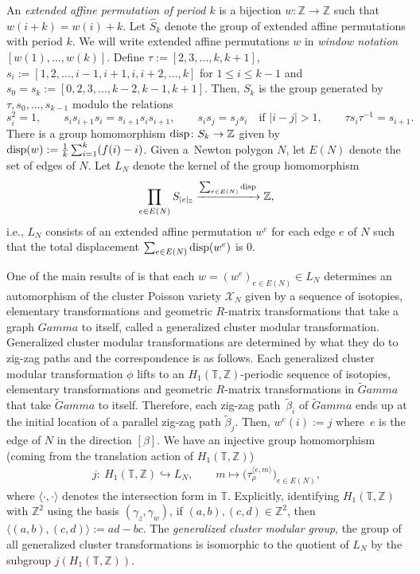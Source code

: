 \documentclass[10pt,a4paper]{amsart}
\numberwithin{equation}{section}
\newcommand{\Z}{{\mathbb Z}}
\newcommand{\T}{{\mathbb T}}
\newcommand{\disp}{{\rm disp}}
\newcommand{\ra}{\rightarrow}
\def\Gamma{Gamma}
\def\widehat#1{#1}
\begin{document}
	An \textit{extended affine permutation of period $k$} is a bijection $w\colon \Z \ra \Z$ such that ${w(i+k)}={w(i)+k}$. Let $\hat S_k$ denote the group of extended affine permutations with period $k$. We will write extended affine permutations $w$ in \emph{window notation} $[w(1), \dots, w(k)]$. Define $\tau\!:=\![2,3,\dots ,k,\allowbreak {k+1}]$, $s_i:= [1,2,\dots ,i-1,i+1,i,i+2,\dots ,k]$ for $1\leq i\leq k-1$ and $s_0=s_k:= [0,2,3,\dots ,{k-2},\allowbreak{k-1},{k+1}]$. Then, $\widehat S_k$ is the group generated by $\tau,s_0,\dots,s_{k-1}$ modulo the relations
	\[
	s_i^2=1, \qquad s_i s_{i+1} s_i = s_{i+1} s_i s_{i+1}, \qquad s_i s_j=s_j s_i \quad \text{if $|i-j|>1$} ,\qquad \tau s_{i}\tau ^{-1}=s_{i+1}.
	\]
	There is a group homomorphism $\disp\colon \widehat S_k \ra \Z$ given by $\disp(w):=\frac 1 k \sum_{i=1}^k (f(i)-i)$. Given a~Newton polygon $N$, let $E(N)$ denote the set of edges of $N$. Let $L_N$ denote the kernel of the group homomorphism
	\[
	\prod_{e \in E(N)} \widehat S_{|e|_\Z} \xrightarrow[]{\sum_{e \in E(N)} \disp} \Z,
	\]
	i.e., $L_N$ consists of an extended affine permutation $w^e$ for each edge $e$ of $N$ such that the total displacement $\sum_{e \in E(N)} \disp(w^e)$ is $0$.
	
One of the main results of \cite{GeRa} is that each $w=(w^e)_{e \in E(N)} \in L_N$ determines an automorphism of the cluster Poisson variety $\mathcal X_N$ given by a sequence of isotopies, elementary transformations and geometric $R$-matrix transformations that take a graph $\Gamma$ to itself, called a {generalized cluster modular transformation}. Generalized cluster modular transformations are determined by what they do to zig-zag paths and the correspondence is as follows. Each generalized cluster modular transformation $\phi$ lifts to an $H_1(\T,\Z)$-periodic sequence of isotopies, elementary transformations and geometric $R$-matrix transformations in $\widetilde \Gamma$ that take $\widetilde \Gamma$ to itself. Therefore, each zig-zag path~$\widetilde \beta_i$ of $\widetilde \Gamma$ ends up at the initial location of a parallel zig-zag path $\widetilde \beta_j$. Then, $w^e(i):=j$ where~$e$ is the edge of $N$ in the direction $[\beta]$. We have an injective group homomorphism (coming from the translation action of $H_1(\T,\Z)$)
	\begin{align*}
		j\colon\ H_1(\T,\Z) \hookrightarrow L_N,\qquad
		m \mapsto \big(\tau_\rho^{\langle e,m \rangle} \big)_{e \in E(N)},
	\end{align*}
	where $\langle \cdot,\cdot \rangle$ denotes the intersection form in $\T$. Explicitly, identifying $H_1(\T,\Z)$ with $\Z^2$ using the basis $(\gamma_z,\gamma_w)$, if $(a,b), (c,d) \in \Z^2$, then $\langle (a,b),(c,d) \rangle := ad-bc$. The \textit{generalized cluster modular group}, the group of all generalized cluster transformations is isomorphic to the quotient of $L_N$ by the subgroup $j(H_1(\T,\Z))$.
	
\end{document}
